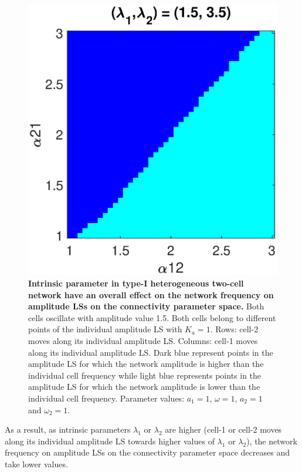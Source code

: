 \begin{figure}[h]
\begin{minipage}{0.32\linewidth}
  \end{minipage} 
   \begin{minipage}{0.32\linewidth}
  \begin{center}
\includegraphics[width=1\linewidth]{Images/photo24_9.eps}
\end{center}
  \end{minipage} 
  
   \caption{\textbf{Intrinsic parameter in type-\textrm{I} heterogeneous two-cell network have an overall effect on the network frequency on amplitude LSs on the connectivity parameter space.} Both cells oscillate with amplitude value 1.5. Both cells belong to different points of the individual amplitude LS with $K_{a}=1$. Rows: cell-2 moves along its individual amplitude LS. Columns: cell-1 moves along its individual amplitude LS. Dark blue represent points in the amplitude LS for which the network amplitude is higher than the individual cell frequency while light blue represents points in the amplitude LS for which the network amplitude is lower than the individual cell frequency. Parameter values: $a_{1} = 1$, $\omega= 1$, $a_{2}=1$ and $\omega_{2}=1$.}
  \label{photo24}
\end{figure}

As a result, as intrinsic parameters $\lambda_{1}$ or $\lambda_{2}$ are higher (cell-1 or cell-2 moves along its individual amplitude LS towards higher values of $\lambda_{1}$ or $\lambda_{2}$), the network frequency on amplitude LSs on the connectivity parameter space decreases and take lower values.

